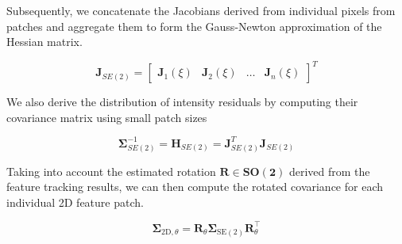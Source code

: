 
Subsequently, we concatenate the Jacobians derived from individual pixels from patches and aggregate them to form the Gauss-Newton approximation of the Hessian matrix.

\begin{equation}
\textbf{J}_{SE(2)}= \begin{bmatrix}
\mathbf{J}_1(\xi)&
\mathbf{J}_2(\xi)&
\dots &
\mathbf{J}_n({\xi})
\end{bmatrix}^T
\end{equation}

We also derive the distribution of intensity residuals by computing their covariance matrix using small patch sizes

\begin{equation}
\pmb{\Sigma}_{S E(2)}^{-1} =\mathbf{H}_{S E(2)}=\mathbf{J}_{S E(2)}^T \mathbf{J}_{S E(2)}
\end{equation}

 Taking into account the estimated rotation $\bm{R \in SO(2)}$ derived from the feature tracking results, we can then compute the rotated covariance for each individual 2D feature patch.
 


\begin{equation}
\boldsymbol{\Sigma}_{2 \mathrm{D}, \theta}=\boldsymbol{R}_\theta \boldsymbol{\Sigma}_{\mathrm{SE(2)}} \boldsymbol{R}_\theta^{\top}    
\end{equation}


